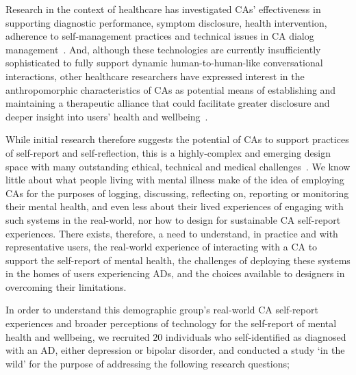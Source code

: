     Research in the context of healthcare has investigated \ac{CA}s' effectiveness in supporting diagnostic performance, symptom disclosure, health intervention, adherence to self-management practices and technical issues in \ac{CA} dialog management~\cite[Table 3]{laranjo2018conversational}. And, although these technologies are currently insufficiently sophisticated to fully support dynamic human-to-human-like conversational interactions, other healthcare researchers have expressed interest in the anthropomorphic characteristics of \ac{CA}s as potential means of establishing and maintaining a therapeutic alliance that could facilitate greater disclosure and deeper insight into users' health and wellbeing~\cite{devault2014simsensei, cameron2018best, lucas2014s, lucas2017reporting, kim2019conversational}.

    While initial research therefore suggests the potential of \ac{CA}s to support practices of self-report and self-reflection, this is a highly-complex and emerging design space with many outstanding ethical, technical and medical challenges~\cite{vaidyam2019chatbots}. We know little about what people living with mental illness make of the idea of employing \ac{CA}s for the purposes of logging, discussing, reflecting on, reporting or monitoring their mental health, and even less about their lived experiences of engaging with such systems in the real-world, nor how to design for sustainable \ac{CA} self-report experiences. There exists, therefore, a need to understand, in practice and with representative users, the real-world experience of interacting with a \ac{CA} to support the self-report of mental health, the challenges of deploying these systems in the homes of users experiencing \ac{AD}s, and the choices available to designers in overcoming their limitations.
    
    In order to understand this demographic group’s real-world \ac{CA} self-report experiences and broader perceptions of technology for the self-report of mental health and wellbeing, we recruited $20$ individuals who self-identified as diagnosed with an \ac{AD}, either depression or bipolar disorder, and conducted a study `in the wild' for the purpose of addressing the following research questions;
    
